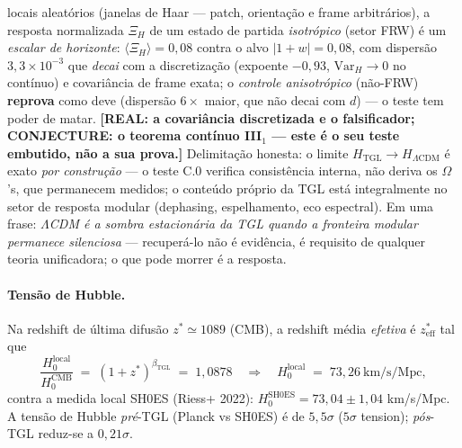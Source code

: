 \documentclass[12pt,a4paper]{article}
\newcommand{\betatgl}{\beta_{\text{TGL}}}
\newcommand{\TGL}{\textsc{TGL}}
\begin{document}
locais aleatórios (janelas de Haar --- patch, orientação e frame arbitrários), a
resposta normalizada $\Xi_H$ de um estado de partida \emph{isotrópico} (setor FRW) é um
\emph{escalar de horizonte}: $\langle\Xi_H\rangle = 0{,}08$ contra o alvo
$|1+w| = 0{,}08$, com dispersão $3{,}3\times10^{-3}$ que \emph{decai} com a
discretização (expoente $-0{,}93$, $\mathrm{Var}_H\to0$ no contínuo) e covariância de
frame exata; o \emph{controle anisotrópico} (não-FRW) \textbf{reprova} como deve
(dispersão $6\times$ maior, que não decai com $d$) --- o teste tem poder de
matar. \textbf{[REAL: a covariância discretizada e o falsificador; CONJECTURE: o
teorema contínuo III$_1$ --- este é o seu teste embutido, não a sua prova.]}  Delimitação honesta: o limite
$H_{\text{TGL}}\to H_{\Lambda\text{CDM}}$ é exato \emph{por construção} --- o teste
C.0 verifica consistência interna, não deriva os $\Omega$'s, que permanecem medidos;
o conteúdo próprio da \TGL{} está integralmente no setor de resposta modular
(dephasing, espelhamento, eco espectral).  Em uma frase: \emph{$\Lambda$CDM é a
sombra estacionária da \TGL{} quando a fronteira modular permanece silenciosa} ---
recuperá-lo não é evidência, é requisito de qualquer teoria unificadora; o que pode
morrer é a resposta.

\paragraph{Tensão de Hubble.}
Na redshift de última difusão $z^{*} \simeq 1089$ (CMB), a redshift média
\emph{efetiva} é $z^{*}_{\text{eff}}$ tal que
\begin{equation}
\frac{H_{0}^{\text{local}}}{H_{0}^{\text{CMB}}}
\;=\; (1+z^{*})^{\betatgl}
\;=\; 1{,}0878
\quad \Rightarrow \quad
H_{0}^{\text{local}} \;=\; 73{,}26~\text{km/s/Mpc},
\label{eq:H0-prediction}
\end{equation}
contra a medida local SH0ES (Riess+ 2022): $H_{0}^{\text{SH0ES}} = 73{,}04 \pm 1{,}04$
km/s/Mpc.  A tensão de Hubble \emph{pré}-\TGL{} (Planck vs SH0ES) é de
$5{,}5\sigma$ ($5\sigma$ tension); \emph{pós}-\TGL{}
reduz-se a $0{,}21\sigma$.
\end{document}
